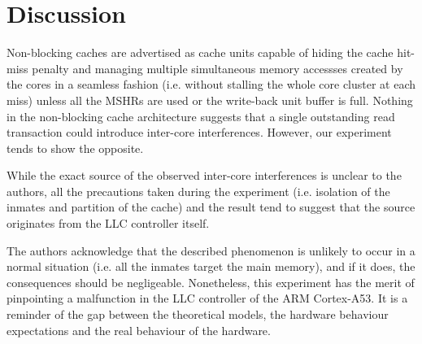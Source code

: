 \section{Discussion}
    Non-blocking caches are advertised as cache units capable of hiding the cache hit-miss penalty and managing multiple simultaneous memory accessses created by the cores in a seamless fashion (i.e. without stalling the whole core cluster at each miss) unless all the MSHRs are used or the write-back unit buffer is full. Nothing in the non-blocking cache architecture suggests that a single outstanding read transaction could introduce inter-core interferences. However, our experiment tends to show the opposite.

    While the exact source of the observed inter-core interferences is unclear to the authors, all the precautions taken during the experiment (i.e. isolation of the inmates and partition of the cache) and the result tend to suggest that the source originates from the LLC controller itself.

    The authors acknowledge that the described phenomenon is unlikely to occur in a normal situation (i.e. all the inmates target the main memory), and if it does, the consequences should be negligeable.
    Nonetheless, this experiment has the merit of pinpointing a malfunction in the LLC controller of the ARM Cortex-A53.
    It is a reminder of the gap between the theoretical models, the hardware behaviour expectations and the real behaviour of the hardware.

